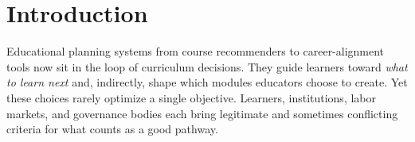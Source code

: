 \documentclass[sigconf,review]{acmart}
\newcommand{\ADS}{\textsc{ADS}\xspace}
\newcommand{\MAPE}{\textsc{MAPE}\xspace}
\begin{document}


\section{Introduction}

Educational planning systems   from course recommenders to career-alignment tools   now sit in the loop of curriculum decisions. They guide learners toward \emph{what to learn next} and, indirectly, shape which modules educators choose to create. Yet these choices rarely optimize a single objective. Learners, institutions, labor markets, and governance bodies each bring legitimate   and sometimes conflicting   criteria for what counts as a good pathway.
\end{document}
